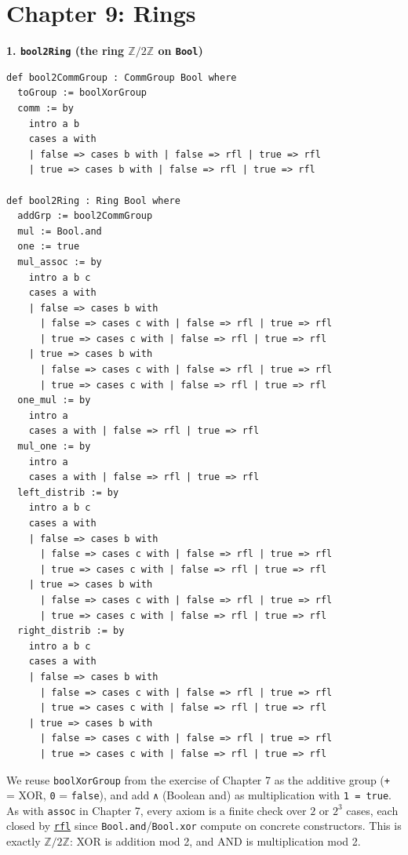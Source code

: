 \section{Chapter 9: Rings}\label{sec:15-appendix-solutions:09-chapter-9:1}

\textbf{1. \texttt{bool2Ring} (the ring \(\mathbb{Z}/2\mathbb{Z}\) on \texttt{Bool})}

\begin{lstlisting}
def bool2CommGroup : CommGroup Bool where
  toGroup := boolXorGroup
  comm := by
    intro a b
    cases a with
    | false => cases b with | false => rfl | true => rfl
    | true => cases b with | false => rfl | true => rfl

def bool2Ring : Ring Bool where
  addGrp := bool2CommGroup
  mul := Bool.and
  one := true
  mul_assoc := by
    intro a b c
    cases a with
    | false => cases b with
      | false => cases c with | false => rfl | true => rfl
      | true => cases c with | false => rfl | true => rfl
    | true => cases b with
      | false => cases c with | false => rfl | true => rfl
      | true => cases c with | false => rfl | true => rfl
  one_mul := by
    intro a
    cases a with | false => rfl | true => rfl
  mul_one := by
    intro a
    cases a with | false => rfl | true => rfl
  left_distrib := by
    intro a b c
    cases a with
    | false => cases b with
      | false => cases c with | false => rfl | true => rfl
      | true => cases c with | false => rfl | true => rfl
    | true => cases b with
      | false => cases c with | false => rfl | true => rfl
      | true => cases c with | false => rfl | true => rfl
  right_distrib := by
    intro a b c
    cases a with
    | false => cases b with
      | false => cases c with | false => rfl | true => rfl
      | true => cases c with | false => rfl | true => rfl
    | true => cases b with
      | false => cases c with | false => rfl | true => rfl
      | true => cases c with | false => rfl | true => rfl
\end{lstlisting}

We reuse \texttt{boolXorGroup} from the exercise of Chapter 7 as the additive group (\texttt{+} = XOR, \texttt{0} = \texttt{false}), and add \texttt{∧} (Boolean and) as multiplication with \texttt{1 = true}. As with \texttt{assoc} in Chapter 7, every axiom is a finite check over \(2\) or \(2^3\) cases, each closed by \href{https://lean-lang.org/doc/reference/latest/Tactic-Proofs/Tactic-Reference/}{\texttt{rfl}} since \texttt{Bool.and}/\texttt{Bool.xor} compute on concrete constructors. This is exactly \(\mathbb{Z}/2\mathbb{Z}\): XOR is addition mod 2, and AND is multiplication mod 2.

